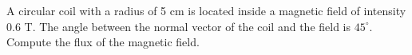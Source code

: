 A circular coil with a radius of 5 cm is located inside a magnetic field %
of intensity 0.6 T. The angle between the
normal vector of the coil and the field is $45^\circ$. 
Compute the flux of the 
magnetic field.